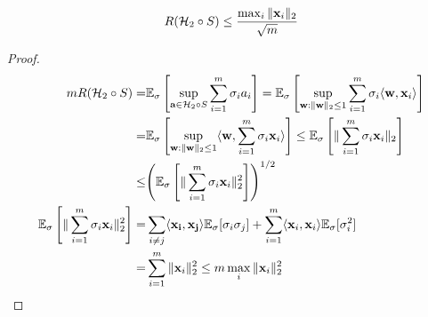 \begin{lemma}
    \begin{equation}
        R( \mathcal{H}_2 \circ S ) \le \frac{\max_i \Arrowvert \mathbf{x}_i \Arrowvert_2}{\sqrt{m}}
    \end{equation}
    \begin{proof}
        \begin{align*}
            mR( \mathcal{H}_2 \circ S) =& \mathbb{E}_\sigma \left[ \sup_{\mathbf{a} \in \mathcal{H}_2 \circ S} \sum^{m}_{i=1} \sigma_i a_i \right] = \mathbb{E}_\sigma \left[ \sup_{\mathbf{w}:\Arrowvert \mathbf{w} \Arrowvert_2 \le 1} \sum^{m}_{i=1} \sigma_i \langle \mathbf{w}, \mathbf{x}_i \rangle \right]\\
            =& \mathbb{E}_\sigma \left[ \sup_{\mathbf{w}:\Arrowvert \mathbf{w} \Arrowvert_2 \le 1} \langle \mathbf{w}, \sum^{m}_{i=1} \sigma_i \mathbf{x}_i \rangle \right]
            \le \mathbb{E}_\sigma \left[ \Arrowvert \sum^{m}_{i=1} \sigma_i \mathbf{x}_i \Arrowvert_2 \right]\\
        \le& {\left( \mathbb{E}_\sigma \left[ \Arrowvert \sum^{m}_{i=1} \sigma_i \mathbf{x}_i \Arrowvert_2^2 \right] \right)}^{1/2} \\
        \mathbb{E}_\sigma \left[ \Arrowvert \sum^{m}_{i=1} \sigma_i \mathbf{x}_i \Arrowvert_2^2 \right]
        =& \sum^{}_{i\ne j} \langle \mathbf{x_i}, \mathbf{x_j} \rangle \mathbb{E}_\sigma[\sigma_i \sigma_j]
        + \sum^{m}_{i=1} \langle \mathbf{x}_i, \mathbf{x}_i \rangle \mathbb{E}_\sigma[\sigma_i^2]\\
        =& \sum^{m}_{i=1} \Arrowvert \mathbf{x}_i \Arrowvert^2_2 \le m \max_i \Arrowvert \mathbf{x}_i \Arrowvert^2_2
        \end{align*}
    \end{proof}
\end{lemma}

